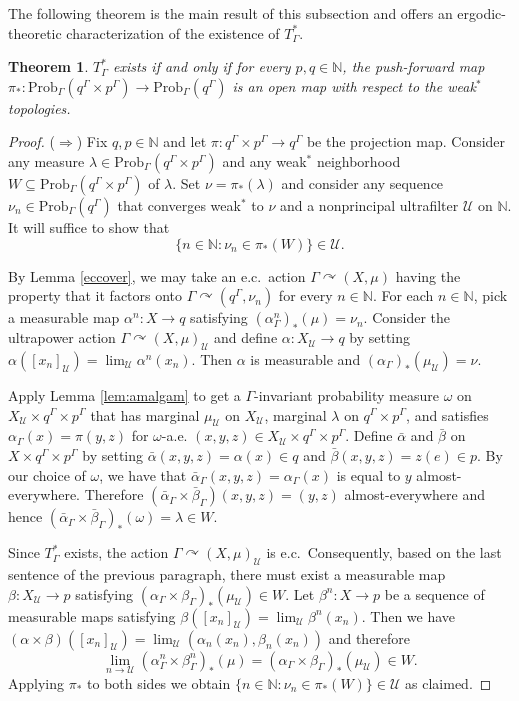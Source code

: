 \documentclass[12pt]{amsart}
\newtheorem{thm}{Theorem}[section]
\theoremstyle{definition}
\def\bb{\mathbb}
\def\bb{\mathbb}
\def\u{\mathsf 1}
\newcommand\bN{{\mathbb N}}
\def \u{\mathcal U}
\newcommand{\acts}{\curvearrowright}
\newcommand{\Prob}{\mathrm{Prob}}
\begin{document}
The following theorem is the main result of this subsection and offers an ergodic-theoretic characterization of the existence of $T_\Gamma^*$.

\begin{thm} \label{prop:openmap}
	$T_\Gamma^*$ exists if and only if for every $p,q \in \bN$, the push-forward map $\pi_*:\Prob_\Gamma(q^\Gamma \times p^\Gamma)\to \Prob_\Gamma(q^\Gamma)$ is an open map with respect to the weak$^*$ topologies.
\end{thm}

\begin{proof}
	($\Rightarrow$) Fix $q, p \in \bN$ and let $\pi : q^\Gamma \times p^\Gamma \rightarrow q^\Gamma$ be the projection map. Consider any measure $\lambda \in \Prob_\Gamma(q^\Gamma \times p^\Gamma)$ and any weak$^*$ neighborhood $W \subseteq \Prob_\Gamma(q^\Gamma \times p^\Gamma)$ of $\lambda$. Set $\nu = \pi_*(\lambda)$ and consider any sequence $\nu_n \in \Prob_\Gamma(q^\Gamma)$ that converges weak$^*$ to $\nu$ and a nonprincipal ultrafilter $\u$ on $\bb N$. It will suffice to show that
	$$\{n \in \bN: \nu_n \in \pi_*(W)\} \in \u.$$
	
	
	By Lemma \ref{eccover}, we may take an e.c.\ action $\Gamma \acts (X, \mu)$ having the property that it factors onto $\Gamma \acts (q^\Gamma, \nu_n)$ for every $n \in \bN$. For each $n\in \bb N$, pick a measurable map $\alpha^n : X \rightarrow q$ satisfying $(\alpha^n_\Gamma)_*(\mu) = \nu_n$. Consider the ultrapower action $\Gamma \acts (X, \mu)_\u$ and define $\alpha : X_\u \rightarrow q$ by setting $\alpha([x_n]_\u) = \lim_\u \alpha^n(x_n)$. Then $\alpha$ is measurable and $(\alpha_\Gamma)_*(\mu_\u) = \nu$.
	
	Apply Lemma \ref{lem:amalgam} to get a $\Gamma$-invariant probability measure $\omega$ on $X_\u \times q^\Gamma \times p^\Gamma$ that has marginal $\mu_\u$ on $X_\u$, marginal $\lambda$ on $q^\Gamma \times p^\Gamma$, and satisfies $\alpha_\Gamma(x) = \pi(y,z)$ for $\omega$-a.e. $(x,y,z) \in X_\u \times q^\Gamma \times p^\Gamma$. Define $\bar{\alpha}$ and $\bar{\beta}$ on $X \times q^\Gamma \times p^\Gamma$ by setting $\bar{\alpha}(x,y,z) = \alpha(x) \in q$ and $\bar{\beta}(x,y,z) = z(e) \in p$. By our choice of $\omega$, we have that $\bar{\alpha}_\Gamma(x,y,z) = \alpha_\Gamma(x)$ is equal to $y$ almost-everywhere. Therefore $(\bar{\alpha}_\Gamma \times \bar{\beta}_\Gamma)(x,y,z) = (y,z)$ almost-everywhere and hence $(\bar{\alpha}_\Gamma \times \bar{\beta}_\Gamma)_*(\omega) = \lambda \in W$.
	
	Since $T_\Gamma^*$ exists, the action $\Gamma \acts (X, \mu)_\u$ is e.c.\ Consequently, based on the last sentence of the previous paragraph, there must exist a measurable map $\beta : X_\u \rightarrow p$ satisfying $(\alpha_\Gamma \times \beta_\Gamma)_*(\mu_\u) \in W$. Let $\beta^n : X \rightarrow p$ be a sequence of measurable maps satisfying $\beta([x_n]_\u) = \lim_\u \beta^n(x_n)$. Then we have $(\alpha \times \beta)([x_n]_\u) = \lim_\u (\alpha_n(x_n), \beta_n(x_n))$ and therefore
	$$\lim_{n \rightarrow \u} (\alpha^n_\Gamma \times \beta^n_\Gamma)_*(\mu) = (\alpha_\Gamma \times \beta_\Gamma)_*(\mu_\u) \in W.$$
	Applying $\pi_*$ to both sides we obtain $\{n \in \bN: \nu_n \in \pi_*(W)\} \in \u$ as claimed.
	

\end{proof}
\end{document}

